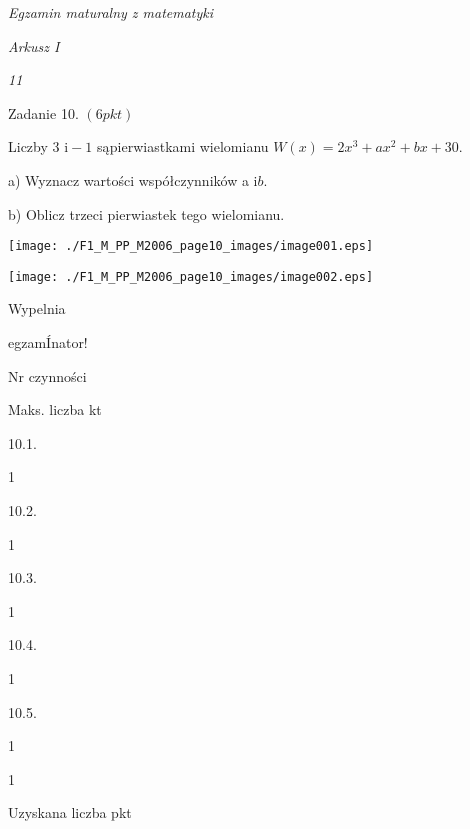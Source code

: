 \documentclass[a4paper,12pt]{article}
\begin{document}
{\it Egzamin maturalny z matematyki}

{\it Arkusz I}

{\it 11}

Zadanie 10. $(6pkt)$

Liczby 3 $\mathrm{i}-1$ sąpierwiastkami wielomianu $W(x)=2x^{3}+ax^{2}+bx+30.$

a) Wyznacz wartości współczynników a $\mathrm{i}b.$

b) Oblicz trzeci pierwiastek tego wielomianu.
\begin{center}
\texttt{[image: ./F1\_M\_PP\_M2006\_page10\_images/image001.eps]}

\texttt{[image: ./F1\_M\_PP\_M2006\_page10\_images/image002.eps]}
\end{center}
Wypelnia

egzamÍnator!

Nr czynności

Maks. liczba kt

10.1.

1

10.2.

1

10.3.

1

10.4.

1

10.5.

1

1

Uzyskana liczba pkt
\end{document}
